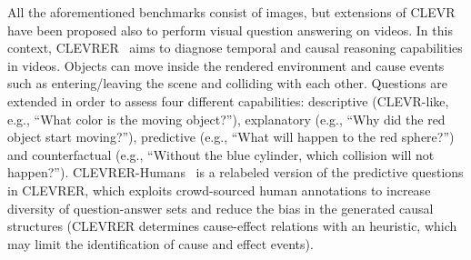 All the aforementioned benchmarks consist of images, but extensions of CLEVR have been proposed also to perform visual question answering on videos.
%
In this context,  CLEVRER~\cite{yi2019clevrer} aims to diagnose temporal and causal reasoning capabilities in videos. Objects can move inside the rendered environment and cause events such as entering/leaving the scene and colliding with each other.
Questions are extended in order to assess four different capabilities: descriptive (CLEVR-like, e.g., ``What color is the moving object?''), explanatory (e.g., ``Why did the red object start moving?''), predictive (e.g., ``What will happen to the red sphere?'') and counterfactual (e.g., ``Without the blue cylinder, which collision will not happen?'').
CLEVRER-Humans~\cite{mao2022clevrer} is a relabeled version of the predictive questions in CLEVRER, which exploits crowd-sourced human annotations to increase diversity of question-answer sets and reduce the bias in the generated causal structures (CLEVRER determines cause-effect relations with an heuristic, which may limit the identification of cause and effect events).
